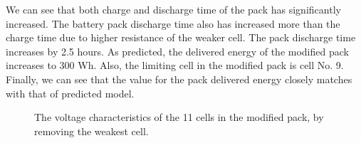 \documentclass[10pt,twocolumn]{IEEEtran}
\begin{document}
We can see that both charge and discharge time of the pack has significantly increased. 
The battery pack discharge time also has increased more than the charge time due to higher resistance of the weaker cell.
The pack discharge time  increases by 2.5 hours.
As predicted,  the delivered energy of the modified pack increases to 300 Wh.
Also,  the limiting cell in the modified pack is cell No. 9. 
Finally, we can see that the value for the pack delivered energy closely matches with that of predicted model.

\begin{figure}
\centering
\vspace{-0.2cm}
{} \vspace{-0.1cm}
\caption{The voltage characteristics of the 11 cells in the modified pack,  by removing the weakest cell. }
\vspace{-0.3cm}
\label{fig:cell_removal3}
\end{figure} 
\end{document}
